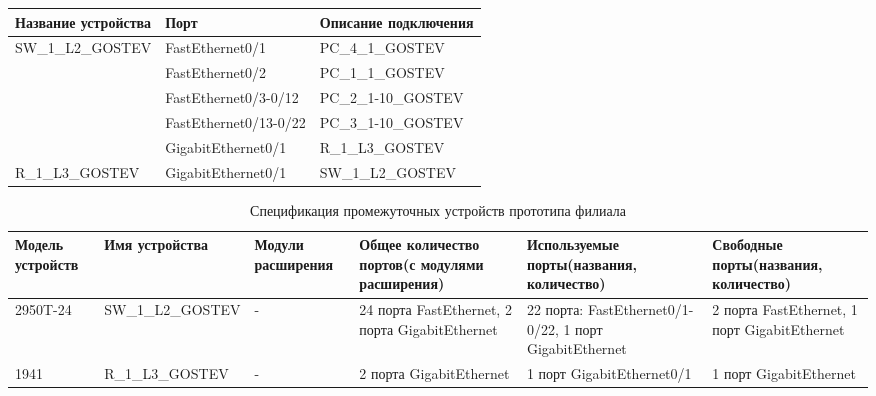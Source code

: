 \documentclass[14pt, a4paper]{extarticle}
\numberwithin{equation}{section}
\begin{document}
\begin{table}[H]
\small
\centering
\begin{tabular}{|l|l|l|}
\hline
\textbf{Название устройства}       & \textbf{Порт}         & \textbf{Описание подключения} \\ \hline
\multirow{5}{*}{SW\_1\_L2\_GOSTEV} & FastEthernet0/1       & PC\_4\_1\_GOSTEV              \\ \cline{2-3} 
                                   & FastEthernet0/2       & PC\_1\_1\_GOSTEV              \\ \cline{2-3} 
                                   & FastEthernet0/3-0/12  & PC\_2\_1-10\_GOSTEV           \\ \cline{2-3} 
                                   & FastEthernet0/13-0/22 & PC\_3\_1-10\_GOSTEV           \\ \cline{2-3} 
                                   & GigabitEthernet0/1    & R\_1\_L3\_GOSTEV              \\ \hline
R\_1\_L3\_GOSTEV                   & GigabitEthernet0/1    & SW\_1\_L2\_GOSTEV             \\ \hline
\end{tabular}
\end{table}


\begin{landscape}
\begin{table}[H]
\centering
\small
\caption{Спецификация промежуточных устройств прототипа филиала}
\begin{tabular}{|m{2.5cm}|m{4cm}|m{3cm}|m{4.2cm}|m{5.3cm}|m{4cm}|}
\hline
\textbf{Модель устройств} & \textbf{Имя устройства} & \textbf{Модули расширения} & \textbf{Общее количество портов(с модулями расширения)} & \textbf{Используемые порты(названия, количество)} & \textbf{Свободные порты(названия, количество)} \\
\hline
2950T-24 &
SW\_1\_L2\_GOSTEV &
- &
24 порта FastEthernet, 2 порта GigabitEthernet &
22 порта: FastEthernet0/1-0/22, 1 порт GigabitEthernet &
2 порта FastEthernet, 1 порт GigabitEthernet \\
\hline
1941 &
R\_1\_L3\_GOSTEV &
- &
2 порта GigabitEthernet &
1 порт GigabitEthernet0/1 &
1 порт GigabitEthernet \\
\hline
\end{tabular}
\end{table}
\end{landscape}
\end{document}
